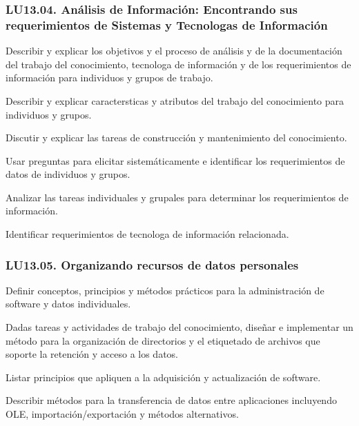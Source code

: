 \subsubsection{LU13.04. Análisis de Información: Encontrando sus requerimientos de Sistemas y Tecnolog­as de Información}\label{sec:LU13.04}
\begin{LearningUnit}
\begin{LUGoal}
\item Describir y explicar los objetivos y el proceso de análisis y de la documentación del trabajo del conocimiento, tecnolog­a de información y de los requerimientos de información para individuos y grupos de trabajo.
\end{LUGoal}

\begin{LUObjective}
\item Describir y explicar caracter­sticas y atributos del trabajo del conocimiento para individuos y grupos.
\item Discutir y explicar las tareas de construcción y mantenimiento del conocimiento.
\item Usar preguntas para elicitar sistemáticamente e identificar los requerimientos de datos de individuos y grupos.
\item Analizar las tareas individuales y grupales para determinar los requerimientos de información.
\item Identificar requerimientos de tecnolog­a de información relacionada.
\end{LUObjective}
\end{LearningUnit}

\subsubsection{LU13.05. Organizando recursos de datos personales}\label{sec:LU13.05}
\begin{LearningUnit}
\begin{LUGoal}
\item Definir conceptos, principios y métodos prácticos para la administración de software y datos individuales.
\end{LUGoal}

\begin{LUObjective}
\item Dadas tareas y actividades de trabajo del conocimiento, diseñar e implementar un método para la organización de directorios y el etiquetado de archivos que soporte la retención y acceso a los datos.
\item Listar principios que apliquen a la adquisición y actualización de software.
\item Describir métodos para la transferencia de datos entre aplicaciones incluyendo OLE, importación/exportación y métodos alternativos.
\end{LUObjective}
\end{LearningUnit}

